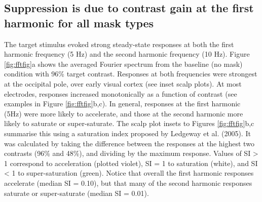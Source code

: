 \documentclass[]{article}
\begin{document}
\hypertarget{suppression-is-due-to-contrast-gain-at-the-first-harmonic-for-all-mask-types}{%
\subsection{Suppression is due to contrast gain at the first harmonic for all mask types}\label{suppression-is-due-to-contrast-gain-at-the-first-harmonic-for-all-mask-types}}

The target stimulus evoked strong steady-state responses at both the first harmonic frequency (5 Hz) and the second harmonic frequency (10 Hz). Figure \ref{fig:fftfig}a shows the averaged Fourier spectrum from the baseline (no mask) condition with 96\% target contrast. Responses at both frequencies were strongest at the occipital pole, over early visual cortex (see inset scalp plots). At most electrodes, responses increased monotonically as a function of contrast (see examples in Figure \ref{fig:fftfig}b,c). In general, responses at the first harmonic (5Hz) were more likely to accelerate, and those at the second harmonic more likely to saturate or super-saturate. The scalp plot insets to Figures \ref{fig:fftfig}b,c summarise this using a saturation index proposed by Ledgeway et al. (2005). It was calculated by taking the difference between the responses at the highest two contrasts (96\% and 48\%), and dividing by the maximum response. Values of SI \textgreater{} 1 correspond to acceleration (plotted violet), SI = 1 to saturation (white), and SI \textless{} 1 to super-saturation (green). Notice that overall the first harmonic responses accelerate (median SI = 0.10), but that many of the second harmonic responses saturate or super-saturate (median SI = 0.01).
\end{document}
